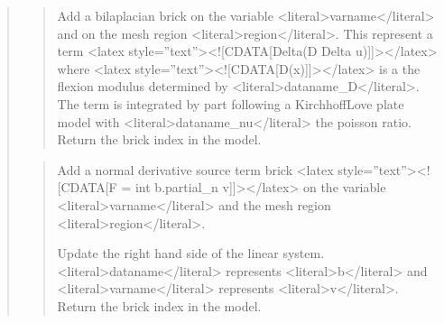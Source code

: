 \documentclass[a4paper,11pt,english]{sphinxmanual}
\begin{document}
\begin{quote}
\sphinxAtStartPar
{}
\begin{quote}

\sphinxAtStartPar
Add a bilaplacian brick on the variable
\textless{}literal\textgreater{}varname\textless{}/literal\textgreater{} and on the mesh region \textless{}literal\textgreater{}region\textless{}/literal\textgreater{}.
This represent a term \textless{}latex style=”text”\textgreater{}\textless{}!{[}CDATA{[}Delta(D Delta u){]}{]}\textgreater{}\textless{}/latex\textgreater{} where \textless{}latex style=”text”\textgreater{}\textless{}!{[}CDATA{[}D(x){]}{]}\textgreater{}\textless{}/latex\textgreater{}
is a the flexion modulus determined by \textless{}literal\textgreater{}dataname\_D\textless{}/literal\textgreater{}. The term is
integrated by part following a Kirchhoff\sphinxhyphen{}Love plate model
with \textless{}literal\textgreater{}dataname\_nu\textless{}/literal\textgreater{} the poisson ratio.
Return the brick index in the model.
\end{quote}

\sphinxAtStartPar
{}
\begin{quote}

\sphinxAtStartPar
Add a normal derivative source term brick
\textless{}latex style=”text”\textgreater{}\textless{}!{[}CDATA{[}F = int b.partial\_n v{]}{]}\textgreater{}\textless{}/latex\textgreater{} on the variable \textless{}literal\textgreater{}varname\textless{}/literal\textgreater{} and the
mesh region \textless{}literal\textgreater{}region\textless{}/literal\textgreater{}.

\sphinxAtStartPar
Update the right hand side of the linear system.
\textless{}literal\textgreater{}dataname\textless{}/literal\textgreater{} represents \textless{}literal\textgreater{}b\textless{}/literal\textgreater{} and \textless{}literal\textgreater{}varname\textless{}/literal\textgreater{} represents \textless{}literal\textgreater{}v\textless{}/literal\textgreater{}.
Return the brick index in the model.
\end{quote}

\sphinxAtStartPar
{}
\begin{quote}


\end{quote}
\end{quote}
\end{document}
